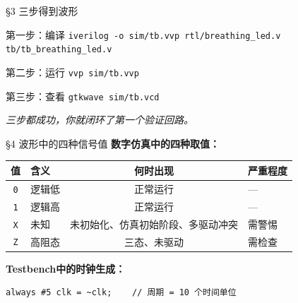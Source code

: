 \documentclass[aspectratio=169]{beamer}
\begin{document}
\begin{frame}{\S3 三步得到波形}
\begin{block}{第一步：编译}
\texttt{iverilog -o sim/tb.vvp rtl/breathing\_led.v tb/tb\_breathing\_led.v}
\end{block}
\begin{block}{第二步：运行}
\texttt{vvp sim/tb.vvp}
\end{block}
\begin{block}{第三步：查看}
\texttt{gtkwave sim/tb.vcd}
\end{block}
\vspace{0.5em}
\centering
\textit{三步都成功，你就闭环了第一个验证回路。}
\end{frame}

\begin{frame}[fragile]{\S4 波形中的四种信号值}
\textbf{数字仿真中的四种取值：}
\vspace{0.5em}

\begin{tabular}{clcl}
\toprule
\textbf{值} & \textbf{含义} & \textbf{何时出现} & \textbf{严重程度} \\
\midrule
\texttt{0} & 逻辑低 & 正常运行 & --- \\
\texttt{1} & 逻辑高 & 正常运行 & --- \\
\texttt{X} & 未知 & 未初始化、仿真初始阶段、多驱动冲突 & \alert{需警惕} \\
\texttt{Z} & 高阻态 & 三态、未驱动 & \alert{需检查} \\
\bottomrule
\end{tabular}

\vspace{0.8em}
\textbf{Testbench中的时钟生成：}
\begin{verbatim}
always #5 clk = ~clk;    // 周期 = 10 个时间单位
\end{verbatim}
\end{frame}
\end{document}
